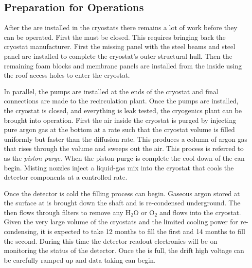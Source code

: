 

%

\subsection{Preparation for Operations}

After the  are installed in the cryostats there remains a lot
of work before they can be operated. First the 
must be closed. This requires bringing back the cryostat manufacturer. 
First the missing panel with the steel beams
and steel panel are installed to complete the cryostat's outer
structural hull. Then the remaining foam blocks and membrane panels
are installed from the inside using the roof access holes 
to enter the cryostat. 

In parallel, the \lar pumps are installed at
the ends of the cryostat and final connections are made to the
recirculation plant. Once the pumps are installed, the cryostat is
closed, and everything is leak tested, the cryogenics plant can be
brought into operation. First the air inside the cryostat is purged by
injecting pure argon gas at the bottom %
at a rate such
that the %
cryostat volume is filled uniformly but faster than the diffusion
rate. This produces a column of argon gas that rises through the volume %
and sweeps out the air. This process is referred to as the \textit{piston
purge}. When the piston purge is complete the cool-down of the 
can begin. Misting nozzles inject a liquid-gas mix into the cryostat
that cools the detector components at a controlled rate. 

Once the detector is
cold the filling process can begin. Gaseous argon stored at the surface 
at \surf is brought down the shaft and is re-condensed underground. The \lar then flows through filters to remove any H$_2$O or O$_2$ and
flows into the cryostat. Given the very large volume of the cryostats
and the limited cooling power for re-condensing, it is  %
expected to take \num{12} months to fill the first  and \num{14} months to
fill the second. During this time the detector readout electronics
will be on monitoring the status of the detector. %
Once the
 is full, the drift high voltage can be carefully ramped up and
data taking can begin.


